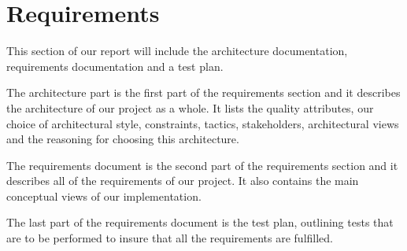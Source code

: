 \documentclass[../document.tex]{subfiles}
\begin{document}
\section{Requirements}

This section of our report will include the architecture documentation, requirements documentation and a test plan.

The architecture part is the first part of the requirements section and it describes the architecture of our project as a whole. It lists the quality attributes, our choice of architectural style, constraints, tactics, stakeholders, architectural views and the reasoning for choosing this architecture.

The requirements document is the second part of the requirements section and it describes all of the requirements of our project. It also contains the main conceptual views of our implementation.

The last part of the requirements document is the test plan, outlining tests that are to be performed to insure that all the requirements are fulfilled.
\end{document}
